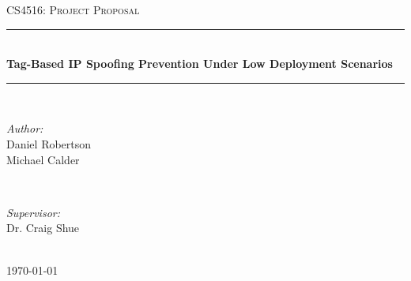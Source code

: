 \documentclass[12pt]{article} %
\begin{document}

\begin{titlepage}

\newcommand{\HRule}{\rule{\linewidth}{0.5mm}} %

\center %

\textsc{\LARGE CS4516: Project Proposal}\\[1.5cm] %

\HRule \\[0.4cm]
{ \huge \bfseries Tag-Based IP Spoofing Prevention Under Low Deployment Scenarios}\\[0.4cm] %
\HRule \\[1.5cm]

\begin{minipage}{0.4\textwidth}
\begin{flushleft} \large
\emph{Author:}\\
Daniel Robertson\\
Michael Calder\\
\end{flushleft}
\end{minipage}
~
\begin{minipage}{0.4\textwidth}
\begin{flushright} \large
\emph{Supervisor:} \\
Dr. Craig Shue %
\end{flushright}
\end{minipage}\\[4cm]

{\large \today}\\[3cm] %


\vfill %

\end{titlepage}

\end{document}
